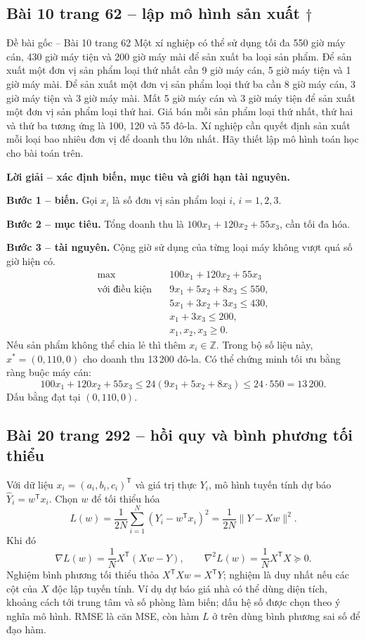 \documentclass[11pt,a4paper]{article}
\newcommand{\grad}{\nabla}
\newcommand{\Hess}{\nabla^2}
\newcommand{\T}{^{\mathsf T}}
\begin{document}
\subsection{Bài 10 trang 62 -- lập mô hình sản xuất \(\dagger\)}
\begin{questionbox}{Đề bài gốc -- Bài 10 trang 62}
Một xí nghiệp có thể sử dụng tối đa 550 giờ máy cán, 430 giờ máy tiện và 200 giờ máy mài để sản xuất ba loại sản phẩm. Để sản xuất một đơn vị sản phẩm loại thứ nhất cần 9 giờ máy cán, 5 giờ máy tiện và 1 giờ máy mài. Để sản xuất một đơn vị sản phẩm loại thứ ba cần 8 giờ máy cán, 3 giờ máy tiện và 3 giờ máy mài. Mất 5 giờ máy cán và 3 giờ máy tiện để sản xuất một đơn vị sản phẩm loại thứ hai. Giá bán mỗi sản phẩm loại thứ nhất, thứ hai và thứ ba tương ứng là 100, 120 và 55 đô-la. Xí nghiệp cần quyết định sản xuất mỗi loại bao nhiêu đơn vị để doanh thu lớn nhất. Hãy thiết lập mô hình toán học cho bài toán trên.
\end{questionbox}

\textbf{Lời giải -- xác định biến, mục tiêu và giới hạn tài nguyên.}

\textbf{Bước 1 -- biến.} Gọi \(x_i\) là số đơn vị sản phẩm loại \(i\), \(i=1,2,3\).

\textbf{Bước 2 -- mục tiêu.} Tổng doanh thu là \(100x_1+120x_2+55x_3\), cần tối đa hóa.

\textbf{Bước 3 -- tài nguyên.} Cộng giờ sử dụng của từng loại máy không vượt quá số giờ hiện có.
\[
\begin{aligned}
\max\quad &100x_1+120x_2+55x_3\\
\text{với điều kiện}\quad
&9x_1+5x_2+8x_3\le550,\\
&5x_1+3x_2+3x_3\le430,\\
&x_1+3x_3\le200,\\
&x_1,x_2,x_3\ge0.
\end{aligned}
\]
Nếu sản phẩm không thể chia lẻ thì thêm \(x_i\in\mathbb Z\). Trong bộ số liệu này, \(x^\ast=(0,110,0)\) cho doanh thu 13\,200 đô-la. Có thể chứng minh tối ưu bằng ràng buộc máy cán:
\[
100x_1+120x_2+55x_3
\le 24(9x_1+5x_2+8x_3)\le24\cdot550=13\,200.
\]
Dấu bằng đạt tại \((0,110,0)\).

\subsection{Bài 20 trang 292 -- hồi quy và bình phương tối thiểu}
Với dữ liệu \(x_i=(a_i,b_i,c_i)\T\) và giá trị thực \(Y_i\), mô hình tuyến tính dự báo \(\widehat Y_i=w\T x_i\). Chọn \(w\) để tối thiểu hóa
\[
L(w)=\frac1{2N}\sum_{i=1}^N(Y_i-w\T x_i)^2
=\frac1{2N}\|Y-Xw\|^2.
\]
Khi đó
\[
\grad L(w)=\frac1N X\T(Xw-Y),\qquad
\Hess L(w)=\frac1N X\T X\succeq0.
\]
Nghiệm bình phương tối thiểu thỏa \(X\T Xw=X\T Y\); nghiệm là duy nhất nếu các cột của \(X\) độc lập tuyến tính. Ví dụ dự báo giá nhà có thể dùng diện tích, khoảng cách tới trung tâm và số phòng làm biến; dấu hệ số được chọn theo ý nghĩa mô hình. RMSE là căn MSE, còn hàm \(L\) ở trên dùng bình phương sai số để đạo hàm.
\end{document}
